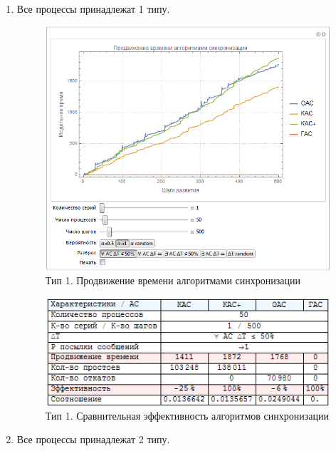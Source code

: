 \begin{enumerate}

\item Все процессы принадлежат 1 типу.

\begin{figure}[H]
\centering
\includegraphics[scale=1]{графика/typeA.png}
\caption{Тип 1. Продвижение времени алгоритмами синхронизации}
\end{figure}

\begin{figure}[H]
\centering
\includegraphics[scale=1]{графика/tableA.png}
\caption{Тип 1. Сравнительная эффективность алгоритмов синхронизации}
\end{figure}

\item Все процессы принадлежат 2 типу.


\end{enumerate}
